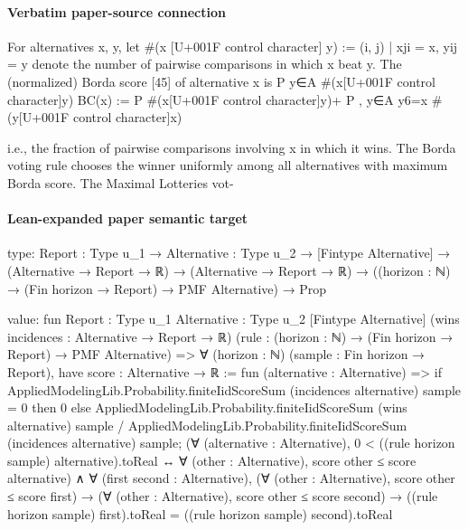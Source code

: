 \documentclass[10pt]{article}
\begin{document}
\paragraph{Verbatim paper-source connection}
\begin{ReviewVerbatim}
For alternatives x, y, let #(x [U+001F control character] y) := {(i, j) | xji = x, yij = y} denote the number of pairwise
comparisons in which x beat y. The (normalized) Borda score [45] of alternative x is
                                                       P
                                                         y∈A #(x[U+001F control character]y)
                                   BC(x) := P         #(x[U+001F control character]y)+
                                                              P             ,
                                                  y∈A           y6=x #(y[U+001F control character]x)


i.e., the fraction of pairwise comparisons involving x in which it wins. The Borda voting rule chooses
the winner uniformly among all alternatives with maximum Borda score. The Maximal Lotteries vot-
\end{ReviewVerbatim}



\paragraph{Lean-expanded paper semantic target}
\begin{ReviewVerbatim}
type:
{Report : Type u_1} →
  {Alternative : Type u_2} →
    [Fintype Alternative] →
      (Alternative → Report → ℝ) →
        (Alternative → Report → ℝ) → ((horizon : ℕ) → (Fin horizon → Report) → PMF Alternative) → Prop

value:
fun {Report : Type u_1} {Alternative : Type u_2} [Fintype Alternative] (wins incidences : Alternative → Report → ℝ)
    (rule : (horizon : ℕ) → (Fin horizon → Report) → PMF Alternative) =>
  ∀ (horizon : ℕ) (sample : Fin horizon → Report),
    have score : Alternative → ℝ := fun (alternative : Alternative) =>
      if AppliedModelingLib.Probability.finiteIidScoreSum (incidences alternative) sample = 0 then 0
      else
        AppliedModelingLib.Probability.finiteIidScoreSum (wins alternative) sample /
          AppliedModelingLib.Probability.finiteIidScoreSum (incidences alternative) sample;
    (∀ (alternative : Alternative),
        0 < ((rule horizon sample) alternative).toReal ↔ ∀ (other : Alternative), score other ≤ score alternative) ∧
      ∀ (first second : Alternative),
        (∀ (other : Alternative), score other ≤ score first) →
          (∀ (other : Alternative), score other ≤ score second) →
            ((rule horizon sample) first).toReal = ((rule horizon sample) second).toReal
\end{ReviewVerbatim}
\end{document}
